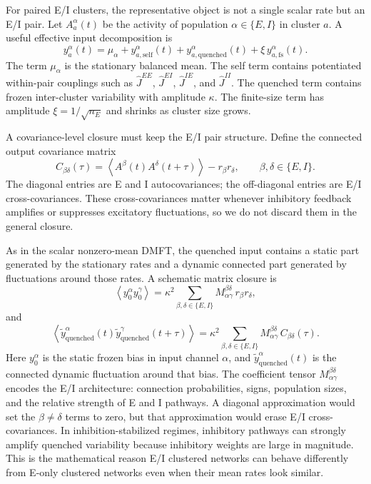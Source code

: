 For paired E/I clusters, the representative object is not a single scalar rate
but an E/I pair. Let \(A_a^\alpha(t)\) be the activity of population
\(\alpha\in\{E,I\}\) in cluster \(a\). A useful effective input decomposition is
\[
        y_a^\alpha(t)
        =
        \mu_\alpha
        +
        y_{a,\mathrm{self}}^\alpha(t)
        +
        y_{a,\mathrm{quenched}}^\alpha(t)
        +
        \xi\,y_{a,\mathrm{fs}}^\alpha(t).
        \label{eq:ch07-ei-input-decomposition}
\]
The term \(\mu_\alpha\) is the stationary balanced mean. The self term contains
potentiated within-pair couplings such as \(\widehat J^{EE}\), \(\widehat J^{EI}\),
\(\widehat J^{IE}\), and \(\widehat J^{II}\). The quenched term contains frozen
inter-cluster variability with amplitude \(\kappa\). The finite-size term has
amplitude \(\xi=1/\sqrt{n_E}\) and shrinks as cluster size grows.

A covariance-level closure must keep the E/I pair structure. Define the
connected output covariance matrix
\[
        C_{\beta\delta}(\tau)
        =
        \left\langle
        A^\beta(t)A^\delta(t+\tau)
        \right\rangle
        -
        r_\beta r_\delta,
        \qquad
        \beta,\delta\in\{E,I\}.
        \label{eq:ch07-ei-output-covariance-matrix}
\]
The diagonal entries are E and I autocovariances; the off-diagonal entries are
E/I cross-covariances. These cross-covariances matter whenever inhibitory
feedback amplifies or suppresses excitatory fluctuations, so we do not discard
them in the general closure.

As in the scalar nonzero-mean DMFT, the quenched input contains a static part
generated by the stationary rates and a dynamic connected part generated by
fluctuations around those rates. A schematic matrix closure is
\[
        \left\langle
        y_{0}^{\alpha}y_{0}^{\gamma}
        \right\rangle
        =
        \kappa^2
        \sum_{\beta,\delta\in\{E,I\}}
        M_{\alpha\gamma}^{\beta\delta}\,
        r_\beta r_\delta,
        \label{eq:ch07-ei-static-quenched-covariance}
\]
and
\[
        \left\langle
        \tilde{y}_{\mathrm{quenched}}^\alpha(t)
        \tilde{y}_{\mathrm{quenched}}^\gamma(t+\tau)
        \right\rangle
        =
        \kappa^2
        \sum_{\beta,\delta\in\{E,I\}}
        M_{\alpha\gamma}^{\beta\delta}\,
        C_{\beta\delta}(\tau).
        \label{eq:ch07-ei-quenched-covariance}
\]
Here \(y_0^\alpha\) is the static frozen bias in input channel \(\alpha\), and
\(\tilde{y}_{\mathrm{quenched}}^\alpha(t)\) is the connected dynamic
fluctuation around that bias. The coefficient tensor
\(M_{\alpha\gamma}^{\beta\delta}\) encodes the E/I architecture: connection
probabilities, signs, population sizes, and the relative strength of E and I
pathways. A diagonal approximation would set the \(\beta\ne\delta\) terms to
zero, but that approximation would erase E/I cross-covariances. In
inhibition-stabilized regimes, inhibitory pathways can strongly amplify
quenched variability because inhibitory weights are large in magnitude. This is
the mathematical reason E/I clustered networks can behave differently from
E-only clustered networks even when their mean rates look similar.

